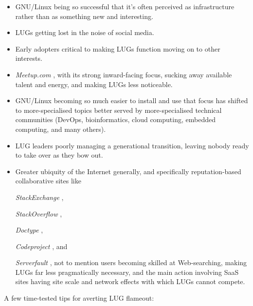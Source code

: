 \begin{itemize}
\item GNU/Linux being so successful that it's often perceived as
infrastructure rather than as something new and interesting.
\item LUGs getting lost in the noise of social media.
\item Early adopters critical to making LUGs function moving
on to other interests.
\item 
\emph{Meetup.com} \texttt{\absurl}
, with its strong inward-facing focus, sucking
away available talent and energy, and making LUGs less noticeable.
\item GNU/Linux becoming so much easier to install
and use that focus has shifted to more-specialised topics better served
by more-specialised technical communities (DevOps, bioinformatics,
cloud computing, embedded computing, and many others).
\item LUG leaders poorly managing a generational transition, 
leaving nobody ready to take over as they bow out.
\item Greater ubiquity of the Internet generally, and
specifically reputation-based collaborative sites like 

\emph{StackExchange} \texttt{\abturl}
,

\emph{StackOverflow} \texttt{\abuurl}
, 

\emph{Doctype} \texttt{\abvurl}
, 

\emph{Codeproject} \texttt{\abwurl}
, and 

\emph{Serverfault} \texttt{\abxurl}
, not to mention 
users becoming skilled at Web-searching, making LUGs far less
pragmatically necessary, and the main action involving SaaS sites having 
site scale and network effects with which LUGs cannot compete.
\end{itemize}


A few time-tested tips for averting LUG flameout:

